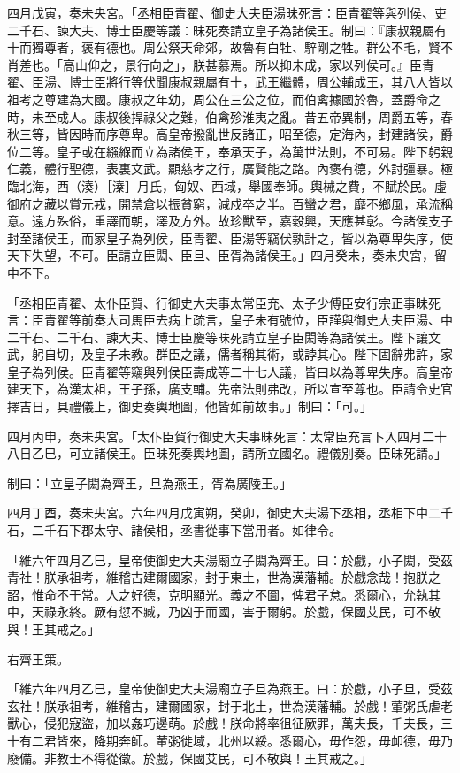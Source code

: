 \begin{pinyinscope}
四月戊寅，奏未央宮。「丞相臣青翟、御史大夫臣湯昧死言：臣青翟等與列侯、吏二千石、諫大夫、博士臣慶等議：昧死奏請立皇子為諸侯王。制曰：『康叔親屬有十而獨尊者，褒有德也。周公祭天命郊，故魯有白牡、騂剛之牲。群公不毛，賢不肖差也。「高山仰之，景行向之」，朕甚慕焉。所以抑未成，家以列侯可。』臣青翟、臣湯、博士臣將行等伏聞康叔親屬有十，武王繼體，周公輔成王，其八人皆以祖考之尊建為大國。康叔之年幼，周公在三公之位，而伯禽據國於魯，蓋爵命之時，未至成人。康叔後捍祿父之難，伯禽殄淮夷之亂。昔五帝異制，周爵五等，春秋三等，皆因時而序尊卑。高皇帝撥亂世反諸正，昭至德，定海內，封建諸侯，爵位二等。皇子或在繦緥而立為諸侯王，奉承天子，為萬世法則，不可易。陛下躬親仁義，體行聖德，表裏文武。顯慈孝之行，廣賢能之路。內褒有德，外討彊暴。極臨北海，西（湊）［溱］月氏，匈奴、西域，舉國奉師。輿械之費，不賦於民。虛御府之藏以賞元戎，開禁倉以振貧窮，減戍卒之半。百蠻之君，靡不鄉風，承流稱意。遠方殊俗，重譯而朝，澤及方外。故珍獸至，嘉穀興，天應甚彰。今諸侯支子封至諸侯王，而家皇子為列侯，臣青翟、臣湯等竊伏孰計之，皆以為尊卑失序，使天下失望，不可。臣請立臣閎、臣旦、臣胥為諸侯王。」四月癸未，奏未央宮，留中不下。

「丞相臣青翟、太仆臣賀、行御史大夫事太常臣充、太子少傅臣安行宗正事昧死言：臣青翟等前奏大司馬臣去病上疏言，皇子未有號位，臣謹與御史大夫臣湯、中二千石、二千石、諫大夫、博士臣慶等昧死請立皇子臣閎等為諸侯王。陛下讓文武，躬自切，及皇子未教。群臣之議，儒者稱其術，或誖其心。陛下固辭弗許，家皇子為列侯。臣青翟等竊與列侯臣壽成等二十七人議，皆曰以為尊卑失序。高皇帝建天下，為漢太祖，王子孫，廣支輔。先帝法則弗改，所以宣至尊也。臣請令史官擇吉日，具禮儀上，御史奏輿地圖，他皆如前故事。」制曰：「可。」

四月丙申，奏未央宮。「太仆臣賀行御史大夫事昧死言：太常臣充言卜入四月二十八日乙巳，可立諸侯王。臣昧死奏輿地圖，請所立國名。禮儀別奏。臣昧死請。」

制曰：「立皇子閎為齊王，旦為燕王，胥為廣陵王。」

四月丁酉，奏未央宮。六年四月戊寅朔，癸卯，御史大夫湯下丞相，丞相下中二千石，二千石下郡太守、諸侯相，丞書從事下當用者。如律令。

「維六年四月乙巳，皇帝使御史大夫湯廟立子閎為齊王。曰：於戲，小子閎，受茲青社！朕承祖考，維稽古建爾國家，封于東土，世為漢藩輔。於戲念哉！抱朕之詔，惟命不于常。人之好德，克明顯光。義之不圖，俾君子怠。悉爾心，允執其中，天祿永終。厥有愆不臧，乃凶于而國，害于爾躬。於戲，保國艾民，可不敬與！王其戒之。」

右齊王策。

「維六年四月乙巳，皇帝使御史大夫湯廟立子旦為燕王。曰：於戲，小子旦，受茲玄社！朕承祖考，維稽古，建爾國家，封于北土，世為漢藩輔。於戲！葷粥氏虐老獸心，侵犯寇盜，加以姦巧邊萌。於戲！朕命將率徂征厥罪，萬夫長，千夫長，三十有二君皆來，降期奔師。葷粥徙域，北州以綏。悉爾心，毋作怨，毋卹德，毋乃廢備。非教士不得從徵。於戲，保國艾民，可不敬與！王其戒之。」


\end{pinyinscope}
